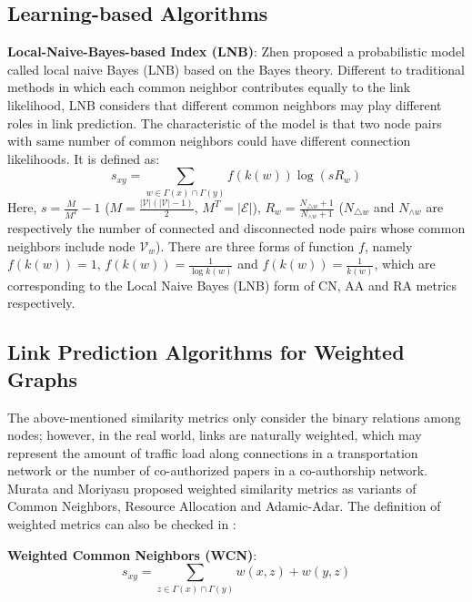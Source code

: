 \documentclass[\main/thesis.tex]{subfiles}
\begin{document}
\subsection{Learning-based Algorithms}
\textbf{Local-Naive-Bayes-based Index (LNB)}: Zhen \cite{liu2011link} proposed a probabilistic model called local naive Bayes (LNB) based on the Bayes theory. Different to traditional methods in which each common neighbor contributes equally to the link likelihood, LNB considers that different common neighbors may play different roles in link prediction. The characteristic of the model is that two node pairs with same number of common neighbors could have different connection likelihoods. It is defined as:
\begin{equation}
s_{xy} = \sum_{w\in \Gamma(x)\cap\Gamma(y)}f(k(w))\log(sR_w)
\end{equation}
Here, $s=\frac{M}{M^T}-1$ ($M=\frac{|\mathcal{V}|(|\mathcal{V}|-1)}{2}$, $M^T=|\mathcal{E}|$), $R_w=\frac{N_{\triangle w}+1}{N_{\wedge w}+1}$ ($N_{\triangle w}$ and $N_{\wedge w}$ are respectively the number of connected and disconnected node pairs whose common neighbors include node $\mathcal{V}_w$). There are three forms of function $f$, namely $f(k(w))=1$, $f(k(w))=\frac{1}{\log k(w)}$ and $f(k(w))=\frac{1}{k(w)}$, which are corresponding to the Local Naive Bayes (LNB) form of CN, AA and RA metrics respectively.

\subsection{Link Prediction Algorithms for Weighted Graphs}
The above-mentioned similarity metrics only consider the binary relations among nodes; however, in the real world, links are naturally weighted, which may represent the amount of traffic load along connections in a transportation network or the number of co-authorized papers in a co-authorship network. Murata and Moriyasu \cite{murata2007link} proposed weighted similarity metrics as variants of Common Neighbors, Resource Allocation and Adamic-Adar. The definition of weighted metrics can also be checked in \cite{lu2010link}:

\textbf{Weighted Common Neighbors (WCN)}:
\begin{equation}
s_{xy}=\sum_{z\in \Gamma(x)\cap\Gamma(y)}w(x,z)+w(y,z) \label{WCN-previous}
\end{equation}
\end{document}
